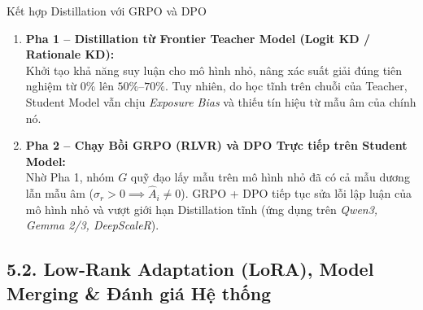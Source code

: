 \begin{frame}{Kết hợp Distillation với GRPO và DPO}
  \small
  \begin{enumerate}\setlength{\itemsep}{4pt}
    \item \textbf{Pha 1 -- Distillation từ Frontier Teacher Model (Logit KD / Rationale KD):}\\
      \small Khởi tạo khả năng suy luận cho mô hình nhỏ, nâng xác suất giải đúng tiên nghiệm từ $0\%$ lên $50\%\text{--}70\%$. Tuy nhiên, do học tĩnh trên chuỗi của Teacher, Student Model vẫn chịu \textit{Exposure Bias} và thiếu tín hiệu từ mẫu âm của chính nó.
    \item \textbf{Pha 2 -- Chạy Bồi GRPO (RLVR) và DPO Trực tiếp trên Student Model:}\\
      \small Nhờ Pha 1, nhóm $G$ quỹ đạo lấy mẫu trên mô hình nhỏ đã có cả mẫu dương lẫn mẫu âm ($\sigma_r > 0 \implies \hat{A}_i \neq 0$). GRPO + DPO tiếp tục sửa lỗi lập luận của mô hình nhỏ và vượt giới hạn Distillation tĩnh (ứng dụng trên \textit{Qwen3, Gemma 2/3, DeepScaleR}).
  \end{enumerate}
  \par\vspace{0pt}
\end{frame}

\subsection{5.2. Low-Rank Adaptation (LoRA), Model Merging \& Đánh giá Hệ thống}

